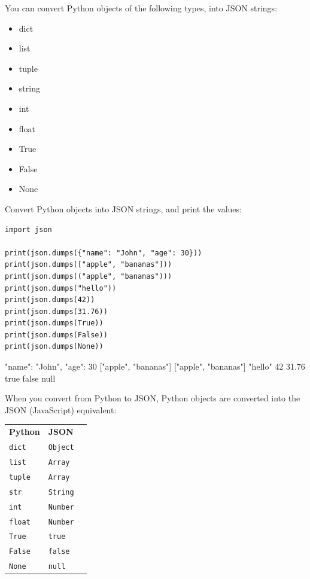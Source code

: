 \documentclass[12pt,a4paper]{article}
\newcommand{\lcode}[1]{%
	\lstinline{#1}%
}
\newcommand{\tcol}[2]{%
	\quad #1 & #2 \\
}
\begin{document}
You can convert Python objects of the following types, into JSON strings:

\begin{multicols}{2}
	\begin{itemize}
	\item dict
	\item list
	\item tuple
	\item string
	\item int
	\item float
	\item True
	\item False
	\item None
	\end{itemize}
\end{multicols}

\begin{ebox}
Convert Python objects into JSON strings, and print the values:
	\begin{lstlisting}
import json

print(json.dumps({"name": "John", "age": 30}))
print(json.dumps(["apple", "bananas"]))
print(json.dumps(("apple", "bananas")))
print(json.dumps("hello"))
print(json.dumps(42))
print(json.dumps(31.76))
print(json.dumps(True))
print(json.dumps(False))
print(json.dumps(None))
	\end{lstlisting}
\tcblower
	\begin{vercode}
{"name": "John", "age": 30}
["apple", "bananas"]
["apple", "bananas"]
"hello"
42
31.76
true
false
null
	\end{vercode}
\end{ebox}

When you convert from Python to JSON, Python objects are converted into the
JSON (JavaScript) equivalent:

\begin{table}[h]
	\begin{center}
		\begin{tabularx}{.3\textwidth}{Xll}
			\tcol{\textbf{Python}}{\textbf{JSON}}
\tcol{\lcode{dict}}{\texttt{Object}}
\tcol{\lcode{list}}{\texttt{Array}}
\tcol{\lcode{tuple}}{\texttt{Array}}
\tcol{\lcode{str}}{\texttt{String}}
\tcol{\lcode{int}}{\texttt{Number}}
\tcol{\lcode{float}}{\texttt{Number}}
\tcol{\lcode{True}}{\texttt{true}}
\tcol{\lcode{False}}{\texttt{false}}
\tcol{\lcode{None}}{\texttt{null}}
		\end{tabularx}
	\end{center}
\end{table}
\end{document}
